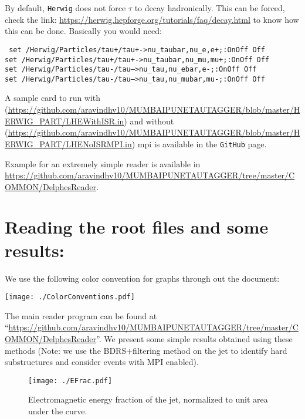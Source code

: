 By default, {\tt Herwig} does not force $\tau$ to decay hadronically. This can be forced, check the link: \url{https://herwig.hepforge.org/tutorials/faq/decay.html} to know how this can be done. Basically you would need:
\begin{center}
    \begin{minipage}{0.8\textwidth}
        {\tt
            set /Herwig/Particles/tau+/tau+->nu\_taubar,nu\_e,e+;:OnOff Off\\
            set /Herwig/Particles/tau+/tau+->nu\_taubar,nu\_mu,mu+;:OnOff Off\\
            set /Herwig/Particles/tau-/tau-->nu\_tau,nu\_ebar,e-;:OnOff Off\\
            set /Herwig/Particles/tau-/tau-->nu\_tau,nu\_mubar,mu-;:OnOff Off
        }
    \end{minipage}
\end{center}

A sample card to run with (\url{https://github.com/aravindhv10/MUMBAIPUNETAUTAGGER/blob/master/HERWIG_PART/LHEWithISR.in}) and without (\url{https://github.com/aravindhv10/MUMBAIPUNETAUTAGGER/blob/master/HERWIG_PART/LHENoISRMPI.in}) mpi is available in the {\tt GitHub} page.

Example for an extremely simple reader is available in \url{https://github.com/aravindhv10/MUMBAIPUNETAUTAGGER/tree/master/COMMON/DelphesReader}.

\section{Reading the root files and some results:}

We use the following color convention for graphs through out the document:
\begin{center}
    \texttt{[image: ./ColorConventions.pdf]}
\end{center}
The main reader program can be found at ``\url{https://github.com/aravindhv10/MUMBAIPUNETAUTAGGER/tree/master/COMMON/DelphesReader}''.
We present some simple results obtained using these methods (Note: we use the BDRS+filtering method on the jet to identify hard substructures and consider events with MPI enabled).

\begin{figure}
    \begin{center}
        \texttt{[image: ./EFrac.pdf]}
        \caption{ Electromagnetic energy fraction of the jet, normalized to unit area under the curve. }
        \label{fig:EFrac}
    \end{center}
\end{figure}

